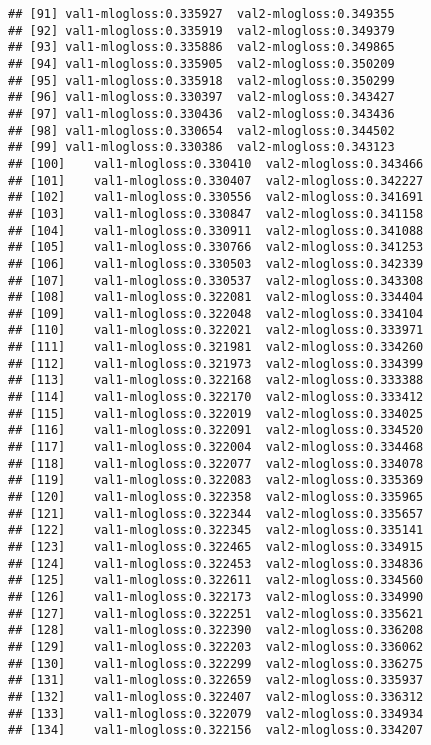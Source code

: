 \documentclass[]{article}
\begin{document}
\begin{verbatim}
## [91] val1-mlogloss:0.335927  val2-mlogloss:0.349355 
## [92] val1-mlogloss:0.335919  val2-mlogloss:0.349379 
## [93] val1-mlogloss:0.335886  val2-mlogloss:0.349865 
## [94] val1-mlogloss:0.335905  val2-mlogloss:0.350209 
## [95] val1-mlogloss:0.335918  val2-mlogloss:0.350299 
## [96] val1-mlogloss:0.330397  val2-mlogloss:0.343427 
## [97] val1-mlogloss:0.330436  val2-mlogloss:0.343436 
## [98] val1-mlogloss:0.330654  val2-mlogloss:0.344502 
## [99] val1-mlogloss:0.330386  val2-mlogloss:0.343123 
## [100]    val1-mlogloss:0.330410  val2-mlogloss:0.343466 
## [101]    val1-mlogloss:0.330407  val2-mlogloss:0.342227 
## [102]    val1-mlogloss:0.330556  val2-mlogloss:0.341691 
## [103]    val1-mlogloss:0.330847  val2-mlogloss:0.341158 
## [104]    val1-mlogloss:0.330911  val2-mlogloss:0.341088 
## [105]    val1-mlogloss:0.330766  val2-mlogloss:0.341253 
## [106]    val1-mlogloss:0.330503  val2-mlogloss:0.342339 
## [107]    val1-mlogloss:0.330537  val2-mlogloss:0.343308 
## [108]    val1-mlogloss:0.322081  val2-mlogloss:0.334404 
## [109]    val1-mlogloss:0.322048  val2-mlogloss:0.334104 
## [110]    val1-mlogloss:0.322021  val2-mlogloss:0.333971 
## [111]    val1-mlogloss:0.321981  val2-mlogloss:0.334260 
## [112]    val1-mlogloss:0.321973  val2-mlogloss:0.334399 
## [113]    val1-mlogloss:0.322168  val2-mlogloss:0.333388 
## [114]    val1-mlogloss:0.322170  val2-mlogloss:0.333412 
## [115]    val1-mlogloss:0.322019  val2-mlogloss:0.334025 
## [116]    val1-mlogloss:0.322091  val2-mlogloss:0.334520 
## [117]    val1-mlogloss:0.322004  val2-mlogloss:0.334468 
## [118]    val1-mlogloss:0.322077  val2-mlogloss:0.334078 
## [119]    val1-mlogloss:0.322083  val2-mlogloss:0.335369 
## [120]    val1-mlogloss:0.322358  val2-mlogloss:0.335965 
## [121]    val1-mlogloss:0.322344  val2-mlogloss:0.335657 
## [122]    val1-mlogloss:0.322345  val2-mlogloss:0.335141 
## [123]    val1-mlogloss:0.322465  val2-mlogloss:0.334915 
## [124]    val1-mlogloss:0.322453  val2-mlogloss:0.334836 
## [125]    val1-mlogloss:0.322611  val2-mlogloss:0.334560 
## [126]    val1-mlogloss:0.322173  val2-mlogloss:0.334990 
## [127]    val1-mlogloss:0.322251  val2-mlogloss:0.335621 
## [128]    val1-mlogloss:0.322390  val2-mlogloss:0.336208 
## [129]    val1-mlogloss:0.322203  val2-mlogloss:0.336062 
## [130]    val1-mlogloss:0.322299  val2-mlogloss:0.336275 
## [131]    val1-mlogloss:0.322659  val2-mlogloss:0.335937 
## [132]    val1-mlogloss:0.322407  val2-mlogloss:0.336312 
## [133]    val1-mlogloss:0.322079  val2-mlogloss:0.334934 
## [134]    val1-mlogloss:0.322156  val2-mlogloss:0.334207 

\end{verbatim}
\end{document}
